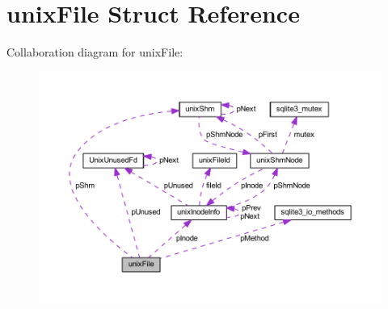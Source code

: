 \hypertarget{structunix_file}{\section{unix\-File Struct Reference}
\label{structunix_file}
}


Collaboration diagram for unix\-File\-:\nopagebreak
\begin{figure}[H]
\begin{center}
\leavevmode
\includegraphics[width=350pt]{structunix_file__coll__graph}
\end{center}
\end{figure}
